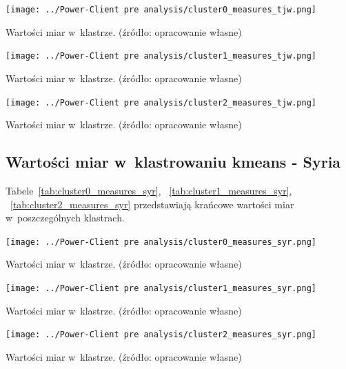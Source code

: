 \documentclass[11pt]{report}
\begin{document}
    \begin{table}[tp]
        \centering
        \texttt{[image: ../Power-Client pre analysis/cluster0\_measures\_tjw.png]}
        \caption{Wartości miar w~klastrze. (źródło: opracowanie własne)}
        \label{tab:cluster0_measures_tjw}
    \end{table}

    \begin{table}[tp]
        \centering
        \texttt{[image: ../Power-Client pre analysis/cluster1\_measures\_tjw.png]}
        \caption{Wartości miar w~klastrze. (źródło: opracowanie własne)}
        \label{tab:cluster1_measures_tjw}
    \end{table}

    \begin{table}[tp]
        \centering
        \texttt{[image: ../Power-Client pre analysis/cluster2\_measures\_tjw.png]}
        \caption{Wartości miar w~klastrze. (źródło: opracowanie własne)}
        \label{tab:cluster2_measures_tjw}
    \end{table}

    \subsection{Wartości miar w~klastrowaniu kmeans - Syria}\label{subsec:wartości-miar-w-klastrowaniu-kmeans---syria}

    Tabele~\ref{tab:cluster0_measures_syr},
    ~\ref{tab:cluster1_measures_syr},
    ~\ref{tab:cluster2_measures_syr}
    przedstawiają krańcowe wartości miar w~poszczególnych klastrach.

    \begin{table}[tp]
        \centering
        \texttt{[image: ../Power-Client pre analysis/cluster0\_measures\_syr.png]}
        \caption{Wartości miar w~klastrze. (źródło: opracowanie własne)}
        \label{tab:cluster0_measures_syr}
    \end{table}

    \begin{table}[tp]
        \centering
        \texttt{[image: ../Power-Client pre analysis/cluster1\_measures\_syr.png]}
        \caption{Wartości miar w~klastrze. (źródło: opracowanie własne)}
        \label{tab:cluster1_measures_syr}
    \end{table}

    \begin{table}[tp]
        \centering
        \texttt{[image: ../Power-Client pre analysis/cluster2\_measures\_syr.png]}
        \caption{Wartości miar w~klastrze. (źródło: opracowanie własne)}
        \label{tab:cluster2_measures_syr}
    \end{table}
\end{document}
